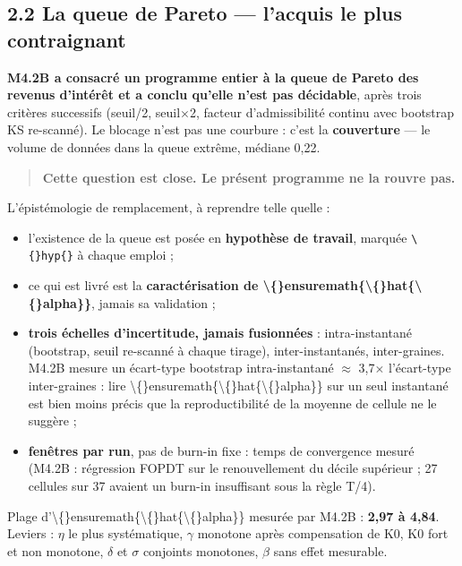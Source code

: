 \documentclass[11pt,a4paper]{article}
\newcommand{\code}[1]{\texttt{#1}}
\begin{document}
\subsection*{2.2 La queue de Pareto --- l'acquis le plus contraignant}

\textbf{M4.2B a consacré un programme entier à la queue de Pareto des revenus d'intérêt et a conclu qu'elle n'est pas décidable}, après trois critères successifs (seuil/2, seuil\ensuremath{\times}2, facteur d'admissibilité continu avec bootstrap KS re-scanné). Le blocage n'est pas une courbure : c'est la \textbf{couverture} --- le volume de données dans la queue extrême, médiane 0,22.

\begin{quote}
\textbf{Cette question est close. Le présent programme ne la rouvre pas.}
\end{quote}

L'épistémologie de remplacement, à reprendre telle quelle :

\begin{itemize}
\item l'existence de la queue est posée en \textbf{hypothèse de travail}, marquée \code{\textbackslash\{\}hyp\{\}} à chaque emploi ;
\item ce qui est livré est la \textbf{caractérisation de \textbackslash\{\}ensuremath\{\textbackslash\{\}hat\{\textbackslash\{\}alpha\}\}}, jamais sa validation ;
\item \textbf{trois échelles d'incertitude, jamais fusionnées} : intra-instantané (bootstrap, seuil re-scanné à chaque tirage), inter-instantanés, inter-graines. M4.2B mesure un écart-type bootstrap intra-instantané \ensuremath{\approx} 3,7\ensuremath{\times} l'écart-type inter-graines : lire \textbackslash\{\}ensuremath\{\textbackslash\{\}hat\{\textbackslash\{\}alpha\}\} sur un seul instantané est bien moins précis que la reproductibilité de la moyenne de cellule ne le suggère ;
\item \textbf{fenêtres par run}, pas de burn-in fixe : temps de convergence mesuré (M4.2B : régression FOPDT sur le renouvellement du décile supérieur ; 27 cellules sur 37 avaient un burn-in insuffisant sous la règle T/4).
\end{itemize}

Plage d'\textbackslash\{\}ensuremath\{\textbackslash\{\}hat\{\textbackslash\{\}alpha\}\} mesurée par M4.2B : \textbf{2,97 à 4,84}. Leviers : \ensuremath{\eta} le plus systématique, \ensuremath{\gamma} monotone après compensation de K0, K0 fort et non monotone, \ensuremath{\delta} et \ensuremath{\sigma} conjoints monotones, \ensuremath{\beta} sans effet mesurable.
\end{document}
